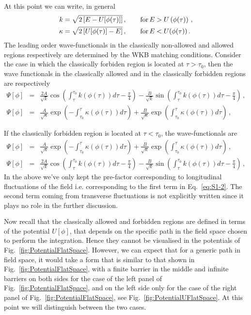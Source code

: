 \documentclass[a4paper,11pt]{article}
\numberwithin{equation}{section}
\begin{document}
At this point we can write, in general
\begin{align}
k & =\sqrt{2\left[E-U[\phi(\tau)]\right]}\,,\qquad {\rm for}\,E>U\left(\phi(\tau)\right) \,,\label{eq:ktau}\\
\kappa & =\sqrt{2\left[U[\phi(\tau)]-E\right]}\,,\qquad {\rm for}\,E<U(\phi(\tau)) \,.\label{eq:kappatau}
\end{align}
The leading order wave-functionals in the classically non-allowed and allowed regions respectively are determined by the WKB matching conditions. Consider the case in which the classically forbiden region is located at $\tau > \tau_0$, then the wave functionals in the classically allowed and in the classically forbidden regions are respectively
\begin{eqnarray}
\Psi[\phi] &=& \frac{2 A}{\sqrt{k} } \cos\left(\int_\tau^{\tau_0} k(\phi(\tau)) d\tau - \frac{\pi}{4}\right) - \frac{B}{\sqrt{k}} \sin\left(\int_\tau^{\tau_0} k(\phi(\tau)) d\tau - \frac{\pi}{4}\right) \,, \nonumber \\
\Psi[\phi] &=& \frac{A}{\sqrt{\kappa} } \exp\left(-\int_{\tau_0}^{\tau} \kappa(\phi(\tau)) d\tau\right) + \frac{B}{\sqrt{\kappa}} \exp\left(\int^\tau_{\tau_0} \kappa(\phi(\tau)) d\tau \right) \,,
\label{eq:WKB1}
\end{eqnarray}

If the classically forbidden region is located at $\tau < \tau_0$, the wave-functionals are
\begin{eqnarray}
\Psi[\phi] &=& \frac{A}{\sqrt{\kappa} } \exp\left(-\int_{\tau_0}^{\tau} \kappa(\phi(\tau)) d\tau\right) + \frac{B}{\sqrt{\kappa}} \exp\left(\int^\tau_{\tau_0} \kappa(\phi(\tau)) d\tau\right) \,, \nonumber \\
\Psi[\phi] &=& \frac{2 A}{\sqrt{k} } \cos\left(\int_\tau^{\tau_0} k(\phi(\tau)) d\tau - \frac{\pi}{4}\right) - \frac{B}{\sqrt{k}} \sin\left(\int_\tau^{\tau_0} k(\phi(\tau)) d\tau - \frac{\pi}{4}\right) \,,
\label{eq:WKB2}
\end{eqnarray}
In the above we've only kept the pre-factor corresponding to  longitudinal fluctuations of the field i.e. corresponding to the first term in Eq.~\eqref{eq:S1-2}. The second term coming from transverse fluctuations is not explicitly written since it plays no role in the further discussion. 

Now recall that the classically allowed and forbidden regions are defined in terms of the potential $U[\phi]$, that depends on the specific path in the field space chosen to perform the integration. Hence they cannot be visualised in the potentials of Fig.~\ref{fig:PotentialFlatSpace}. However, we can expect that for a generic path in field space, it would take a form that is similar to that shown in Fig.~\ref{fig:PotentialFlatSpace}, with a finite barrier in the middle and infinite barriers on both sides for the case of the left panel of Fig.~\ref{fig:PotentialFlatSpace}, and on the left side only for the case of the right panel of Fig.~\ref{fig:PotentialFlatSpace}, see Fig.~\ref{fig:PotentialUFlatSpace}. At this point we will distinguish between the two cases.
\end{document}

